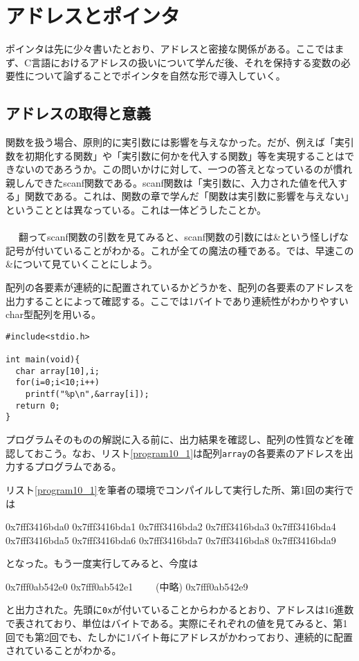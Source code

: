\section{アドレスとポインタ}
ポインタは先に少々書いたとおり、アドレスと密接な関係がある。ここではまず、C言語におけるアドレスの扱いについて学んだ後、それを保持する変数の必要性について論ずることでポインタを自然な形で導入していく。
\subsection{アドレスの取得と意義}
関数を扱う場合、原則的に実引数には影響を与えなかった。だが、例えば「実引数を初期化する関数」や「実引数に何かを代入する関数」等を実現することはできないのであろうか。この問いかけに対して、一つの答えとなっているのが慣れ親しんできたscanf関数である。scanf関数は「実引数に、入力された値を代入する」関数である。これは、関数の章で学んだ「関数は実引数に影響を与えない」ということとは異なっている。これは一体どうしたことか。
\\ \\　
翻ってscanf関数の引数を見てみると、scanf関数の引数には\&という怪しげな記号が付いていることがわかる。これが全ての魔法の種である。では、早速この\&について見ていくことにしよう。
\begin{boxnote}
\begin{multicols}{2}
配列の各要素が連続的に配置されているかどうかを、配列の各要素のアドレスを出力することによって確認する。ここでは1バイトであり連続性がわかりやすいchar型配列を用いる。
\begin{lstlisting}[caption=配列のアドレス確認,label=program10_1]
#include<stdio.h>

int main(void){
  char array[10],i;
  for(i=0;i<10;i++)
    printf("%p\n",&array[i]);
  return 0;
}
\end{lstlisting}
\end{multicols}
\end{boxnote}

プログラムそのものの解説に入る前に、出力結果を確認し、配列の性質などを確認しておこう。なお、リスト\ref{program10_1}は配列\verb|array|の各要素のアドレスを出力するプログラムである。

リスト\ref{program10_1}を筆者の環境でコンパイルして実行した所、第1回の実行では
\begin{code}
0x7fff3416bda0
0x7fff3416bda1
0x7fff3416bda2
0x7fff3416bda3
0x7fff3416bda4
0x7fff3416bda5
0x7fff3416bda6
0x7fff3416bda7
0x7fff3416bda8
0x7fff3416bda9
\end{code}
となった。もう一度実行してみると、今度は
\begin{code}
0x7fff0ab542e0
0x7fff0ab542e1
　　(中略)
0x7fff0ab542e9
\end{code}
と出力された。先頭に\verb|0x|が付いていることからわかるとおり、アドレスは16進数で表されており、単位はバイトである。実際にそれぞれの値を見てみると、第1回でも第2回でも、たしかに1バイト毎にアドレスがかわっており、連続的に配置されていることがわかる。

